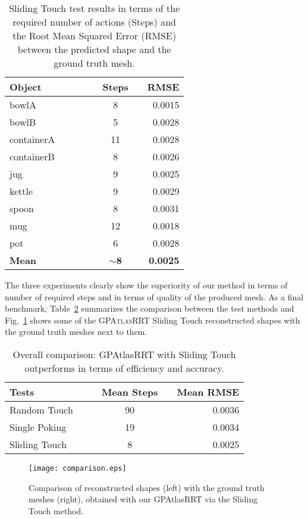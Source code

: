 \begin{table}
    \centering
    \begin{tabularx}{0.95\columnwidth}{lccccccr}
        \toprule
        Object & & &&& Steps && RMSE \\
        \midrule
        bowlA &&& & &8 && 0.0015\\
        bowlB & &&& &5 && 0.0028\\
        containerA &&&&& 11 && 0.0028\\
        containerB &&&&& 8 && 0.0026\\
        jug &&&&& 9 && 0.0025\\
        kettle &&&&& 9 && 0.0029\\
        spoon &&&&& 8 && 0.0031\\
        mug &&&&& 12 && 0.0018\\
        pot &&&&& 6 && 0.0028\\
        \midrule
        \textbf{Mean} &&&&& $\sim$\textbf{8} && \textbf{0.0025}\\
        \bottomrule
    \end{tabularx}
    \caption{Sliding Touch test results in terms of the required
    number of actions (Steps) and the Root Mean Squared Error (RMSE) between
    the predicted shape and the ground truth mesh.}
    \label{tab:test3}
\end{table}

The three experiments clearly show the superiority of our method in terms of number of required steps
and in terms of quality of the produced mesh. As a final benchmark, Table~\ref{tab:comp} summarizes the comparison
between the test methods and Fig.~\ref{fig:shapecomp} shows some  of the \textsc{GPAtlasRRT} Sliding Touch reconstructed shapes with
the ground truth meshes next to them.
\begin{table}
    \centering
    \begin{tabularx}{0.95\columnwidth}{lccccr}
        \toprule
        Tests  &&& Mean Steps && Mean RMSE \\
        \midrule
        Random Touch & & &90 && 0.0036\\
        Single Poking && &19 && 0.0034\\
        Sliding Touch &&& 8 && 0.0025\\
        \bottomrule
    \end{tabularx}
    \caption{Overall comparison: GPAtlasRRT with Sliding Touch outperforms in terms
    of efficiency and accuracy.}
    \label{tab:comp}
\end{table}
\begin{figure}[htb]
    \centering
    \texttt{[image: comparison.eps]}
    \caption{Comparison of reconstructed shapes (left) with the ground truth meshes (right), obtained with our GPAtlasRRT via the Sliding Touch method.}
    \label{fig:shapecomp}
\end{figure}

